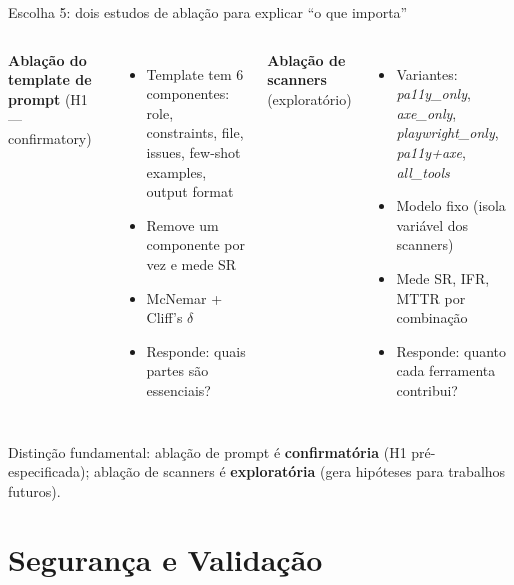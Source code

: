 \documentclass[aspectratio=169]{beamer}
\begin{document}
\begin{frame}{Escolha 5: dois estudos de ablação para explicar ``o que importa''}
\small
\begin{columns}[T]
\textbf{Ablação do template de prompt} (H1 --- confirmatory)
\begin{itemize}
  \item Template tem 6 componentes:\\
        role, constraints, file, issues, few-shot examples, output format
  \item Remove um componente por vez e mede SR
  \item McNemar + Cliff's $\delta$
  \item Responde: quais partes são essenciais?
\end{itemize}

\textbf{Ablação de scanners} (exploratório)
\begin{itemize}
  \item Variantes: \emph{pa11y\_only}, \emph{axe\_only},
        \emph{playwright\_only}, \emph{pa11y+axe}, \emph{all\_tools}
  \item Modelo fixo (isola variável dos scanners)
  \item Mede SR, IFR, MTTR por combinação
  \item Responde: quanto cada ferramenta contribui?
\end{itemize}
\end{columns}

\vspace{0.5em}
\small
\alert{Distinção fundamental}: ablação de prompt é \textbf{confirmatória}
(H1 pré-especificada); ablação de scanners é \textbf{exploratória}
(gera hipóteses para trabalhos futuros).
\end{frame}

\section{Segurança e Validação}
\end{document}
